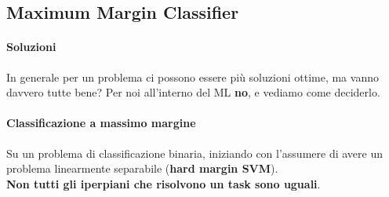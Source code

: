 \documentclass[10pt]{book}
\begin{document}
\subsection{Maximum Margin Classifier}
\paragraph{Soluzioni} In generale per un problema ci possono essere più soluzioni ottime, ma vanno davvero tutte bene? Per noi all'interno del ML \textbf{no}, e vediamo come deciderlo.
\paragraph{Classificazione a massimo margine} Su un problema di classificazione binaria, iniziando con l'assumere di avere un problema linearmente separabile (\textbf{hard margin SVM}).\\
\textbf{Non tutti gli iperpiani che risolvono un task sono uguali}.
\end{document}

